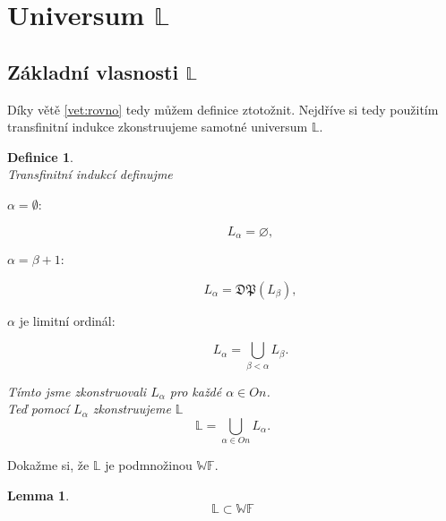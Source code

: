 \documentclass[12pt,a4paper]{article}
\newtheorem{lemma}[veta]{Lemma}
\newtheorem{definice}[veta]{Definice}
\begin{document}
\section{Universum $ \mathbb{L} $}
\subsection{Z\'{a}kladn\'{i} vlasnosti $ \mathbb{L} $}
D\'{i}ky v\v{e}t\v{e} \ref{vet:rovno} tedy m\r{u}\v{z}em definice ztoto\v{z}nit.  
Nejd\v{r}\'{i}ve si tedy pou\v{z}it\'{i}m transfinitn\'{i} indukce zkonstruujeme samotn\'{e} universum $ \mathbb{L} $.
\begin{definice}~\\
Transfinitn\'{i} indukc\'{i} definujme
\begin{description}
\item[$ \alpha=\emptyset $:] 
\[ L_\alpha=\varnothing , \]
\item[$ \alpha=\beta+1 $:] 
\[ L_{\alpha}=\mathfrak{DP}(L_\beta), \]
\item[$ \alpha  $ je  limitn\'{i} ordin\'{a}l:]
\[ L_{\alpha }=\bigcup_{\beta< \alpha} L_\beta . \] 
\end{description}
T\'{i}mto jsme zkonstruovali $ L_{\alpha } $ pro ka\v{z}d\'{e} $ \alpha \in \textit{On} $. \\ Te\v{d} pomoc\'{i} $ L_{\alpha } $ zkonstruujeme $ \mathbb{L} $ \[ \mathbb{L}=\bigcup_{\alpha \in \textit{On}} L_\alpha.\]
\end{definice}
Doka\v{z}me si, \v{z}e $ \mathbb{L} $ je podmno\v{z}inou $\mathbb{WF}$.
\begin{lemma}
\label{lem:subwf}
\[ \mathbb{L} \subset \mathbb{WF} \]
\end{lemma}
\end{document}

